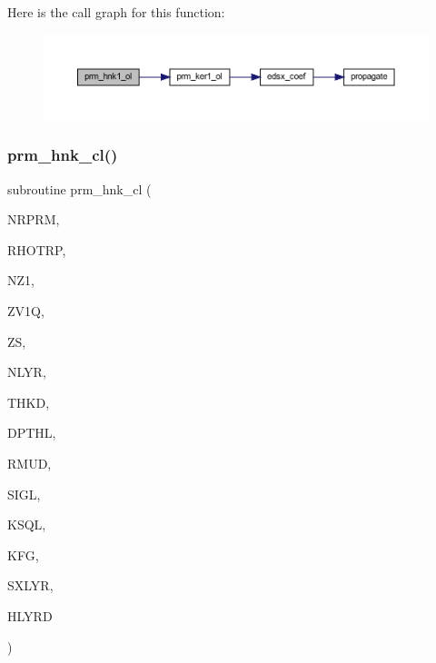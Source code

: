 Here is the call graph for this function\+:\nopagebreak
\begin{figure}[H]
\begin{center}
\leavevmode
\includegraphics[width=350pt]{Leroi__c_8f90_addd341d907a00b743326c01025f01020_cgraph}
\end{center}
\end{figure}
\mbox{\label{Leroi__c_8f90_a677c57fa23bac760da7b8f845b3f9f9d}} 
\subsubsection{\texorpdfstring{prm\+\_\+hnk\+\_\+cl()}{prm\_hnk\_cl()}}
{\footnotesize\ttfamily subroutine prm\+\_\+hnk\+\_\+cl (\begin{DoxyParamCaption}\item[{integer}]{N\+R\+P\+RM,  }\item[{real, dimension(nrprm)}]{R\+H\+O\+T\+RP,  }\item[{integer}]{N\+Z1,  }\item[{real(kind=ql), dimension(nz1)}]{Z\+V1Q,  }\item[{real(kind=ql)}]{ZS,  }\item[{integer}]{N\+L\+YR,  }\item[{real(kind=ql), dimension (nlyr)}]{T\+H\+KD,  }\item[{real(kind=ql), dimension (nlyr)}]{D\+P\+T\+HL,  }\item[{real(kind=ql), dimension(0\+:nlyr)}]{R\+M\+UD,  }\item[{complex(kind=ql), dimension (nlyr)}]{S\+I\+GL,  }\item[{complex(kind=ql), dimension (nlyr)}]{K\+S\+QL,  }\item[{integer}]{K\+FG,  }\item[{integer}]{S\+X\+L\+YR,  }\item[{complex(kind=ql), dimension(nrprm,3,nz1)}]{H\+L\+Y\+RD }\end{DoxyParamCaption})}

